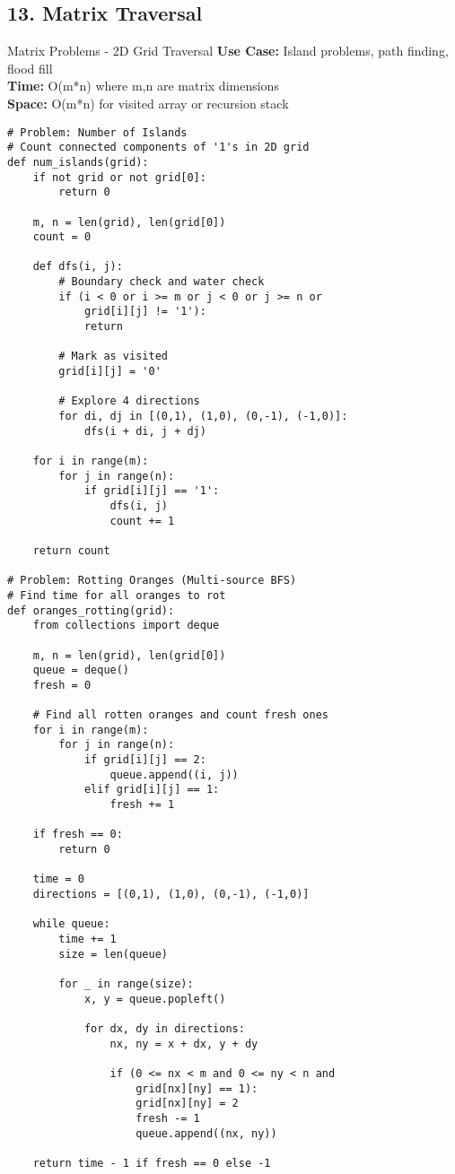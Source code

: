 \documentclass[10pt,a4paper]{article}
\begin{document}
\subsection{13. Matrix Traversal}

\begin{patternbox}{Matrix Problems - 2D Grid Traversal}
\textbf{Use Case:} Island problems, path finding, flood fill\\
\textbf{Time:} O(m*n) where m,n are matrix dimensions\\
\textbf{Space:} O(m*n) for visited array or recursion stack
\end{patternbox}

\begin{lstlisting}
# Problem: Number of Islands
# Count connected components of '1's in 2D grid
def num_islands(grid):
    if not grid or not grid[0]:
        return 0

    m, n = len(grid), len(grid[0])
    count = 0

    def dfs(i, j):
        # Boundary check and water check
        if (i < 0 or i >= m or j < 0 or j >= n or
            grid[i][j] != '1'):
            return

        # Mark as visited
        grid[i][j] = '0'

        # Explore 4 directions
        for di, dj in [(0,1), (1,0), (0,-1), (-1,0)]:
            dfs(i + di, j + dj)

    for i in range(m):
        for j in range(n):
            if grid[i][j] == '1':
                dfs(i, j)
                count += 1

    return count

# Problem: Rotting Oranges (Multi-source BFS)
# Find time for all oranges to rot
def oranges_rotting(grid):
    from collections import deque

    m, n = len(grid), len(grid[0])
    queue = deque()
    fresh = 0

    # Find all rotten oranges and count fresh ones
    for i in range(m):
        for j in range(n):
            if grid[i][j] == 2:
                queue.append((i, j))
            elif grid[i][j] == 1:
                fresh += 1

    if fresh == 0:
        return 0

    time = 0
    directions = [(0,1), (1,0), (0,-1), (-1,0)]

    while queue:
        time += 1
        size = len(queue)

        for _ in range(size):
            x, y = queue.popleft()

            for dx, dy in directions:
                nx, ny = x + dx, y + dy

                if (0 <= nx < m and 0 <= ny < n and
                    grid[nx][ny] == 1):
                    grid[nx][ny] = 2
                    fresh -= 1
                    queue.append((nx, ny))

    return time - 1 if fresh == 0 else -1
\end{lstlisting}
\end{document}
